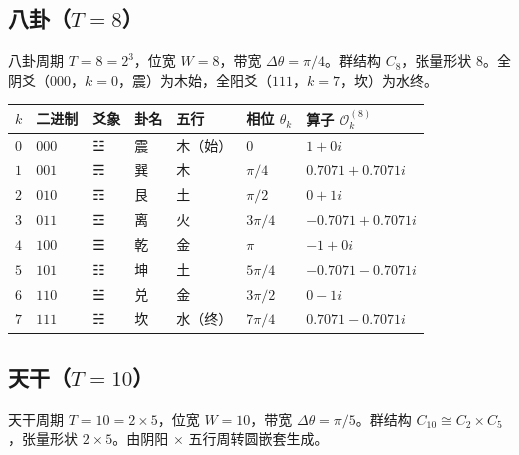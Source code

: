 \subsection{\texorpdfstring{八卦（$T=8$）}{八卦（T=8）}}

\begin{definition}[八卦相位算子]\label{def:bagua_operators}
八卦周期 $T=8=2^3$，位宽 $W=8$，带宽 $\Delta\theta=\pi/4$。群结构 $C_8$，张量形状 $8$。全阴爻（$000$，$k=0$，震）为木始，全阳爻（$111$，$k=7$，坎）为水终。
\end{definition}

\begin{center}
\begin{tabular}{>{\centering\arraybackslash}p{1cm}>{\centering\arraybackslash}p{1.2cm}>{\centering\arraybackslash}p{1cm}>{\centering\arraybackslash}p{1.2cm}>{\centering\arraybackslash}p{1.2cm}>{\centering\arraybackslash}p{2cm}>{\centering\arraybackslash}p{3.5cm}}
\toprule
$k$ & 二进制 & 爻象 & 卦名 & 五行 & 相位 $\theta_k$ & 算子 $\mathcal{O}_k^{(8)}$ \\
\midrule
$0$ & $000$ & ☳ & 震 & 木（始） & $0$ & $1+0i$ \\
$1$ & $001$ & ☴ & 巽 & 木 & $\pi/4$ & $0.7071+0.7071i$ \\
$2$ & $010$ & ☶ & 艮 & 土 & $\pi/2$ & $0+1i$ \\
$3$ & $011$ & ☲ & 离 & 火 & $3\pi/4$ & $-0.7071+0.7071i$ \\
$4$ & $100$ & ☰ & 乾 & 金 & $\pi$ & $-1+0i$ \\
$5$ & $101$ & ☷ & 坤 & 土 & $5\pi/4$ & $-0.7071-0.7071i$ \\
$6$ & $110$ & ☱ & 兑 & 金 & $3\pi/2$ & $0-1i$ \\
$7$ & $111$ & ☵ & 坎 & 水（终） & $7\pi/4$ & $0.7071-0.7071i$ \\
\bottomrule
\end{tabular}
\end{center}

\subsection{\texorpdfstring{天干（$T=10$）}{天干（T=10）}}

\begin{definition}[天干相位算子]\label{def:tiangan_operators}
天干周期 $T=10=2 \times 5$，位宽 $W=10$，带宽 $\Delta\theta=\pi/5$。群结构 $C_{10} \cong C_2 \times C_5$，张量形状 $2 \times 5$。由阴阳 $\times$ 五行周转圆嵌套生成。
\end{definition}

